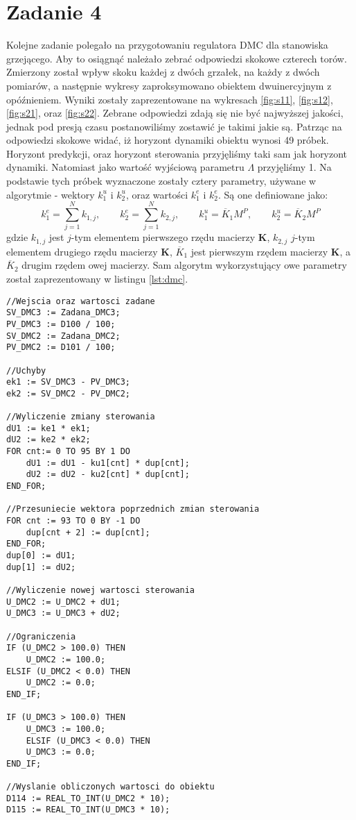 \chapter{Zadanie 4}
Kolejne zadanie polegało na przygotowaniu regulatora DMC dla stanowiska
grzejącego. Aby to osiągnąć należało zebrać odpowiedzi skokowe czterech torów.
Zmierzony został wpływ skoku każdej z dwóch grzałek, na każdy z dwóch pomiarów,
a następnie wykresy zaproksymowano obiektem dwuinercyjnym z opóźnieniem.
Wyniki zostały zaprezentowane na wykresach \ref{fig:s11}, \ref{fig:s12}, \ref{fig:s21},
oraz \ref{fig:s22}. Zebrane odpowiedzi zdają się nie być najwyższej jakości,
jednak pod presją czasu postanowiliśmy zostawić je takimi jakie są. Patrząc
na odpowiedzi skokowe widać, iż horyzont dynamiki obiektu wynosi 49 próbek.
Horyzont predykcji, oraz horyzont sterowania przyjęliśmy taki sam jak horyzont
dynamiki. Natomiast jako wartość wyjściową parametru $\Lambda$ przyjęliśmy
1. Na podstawie tych próbek wyznaczone zostały cztery parametry, używane
w algorytmie - wektory $k^u_1$ i $k^u_2$, oraz wartości $k^e_1$ i $k^e_2$.
Są one definiowane jako:
\begin{equation}
  k^e_1 = \sum_{j=1}^Nk_{1,j}, \qquad k^e_2 = \sum_{j=1}^Nk_{2,j}, \qquad k^u_1 = \overline{K}_1M^P, \qquad k^u_2 = \overline{K}_2M^P
\end{equation}
gdzie $k_{1,j}$ jest $j$-tym elementem pierwszego rzędu macierzy $\bm{K}$,
$k_{2,j}$ $j$-tym elementem drugiego rzędu macierzy $\bm{K}$, $\overline{K}_1$
jest pierwszym rzędem macierzy $\bm{K}$, a $\overline{K}_2$ drugim rzędem owej
macierzy. Sam algorytm wykorzystujący owe parametry został zaprezentowany w
listingu \ref{lst:dmc}.

\begin{lstlisting}[style=customlatex,frame=single, caption=Kod regulatora DMC, label=lst:dmc]
//Wejscia oraz wartosci zadane
SV_DMC3 := Zadana_DMC3;
PV_DMC3 := D100 / 100;
SV_DMC2 := Zadana_DMC2;
PV_DMC2 := D101 / 100;

//Uchyby
ek1 := SV_DMC3 - PV_DMC3;
ek2 := SV_DMC2 - PV_DMC2;

//Wyliczenie zmiany sterowania
dU1 := ke1 * ek1;
dU2 := ke2 * ek2;
FOR cnt:= 0 TO 95 BY 1 DO
	dU1 := dU1 - ku1[cnt] * dup[cnt];
	dU2 := dU2 - ku2[cnt] * dup[cnt];
END_FOR;

//Przesuniecie wektora poprzednich zmian sterowania
FOR cnt := 93 TO 0 BY -1 DO
	dup[cnt + 2] := dup[cnt];
END_FOR;
dup[0] := dU1;
dup[1] := dU2;

//Wyliczenie nowej wartosci sterowania
U_DMC2 := U_DMC2 + dU1;
U_DMC3 := U_DMC3 + dU2;

//Ograniczenia
IF (U_DMC2 > 100.0) THEN
	U_DMC2 := 100.0;
ELSIF (U_DMC2 < 0.0) THEN
	U_DMC2 := 0.0;
END_IF;

IF (U_DMC3 > 100.0) THEN
	U_DMC3 := 100.0;
	ELSIF (U_DMC3 < 0.0) THEN
	U_DMC3 := 0.0;
END_IF;

//Wyslanie obliczonych wartosci do obiektu
D114 := REAL_TO_INT(U_DMC2 * 10);
D115 := REAL_TO_INT(U_DMC3 * 10);
\end{lstlisting}

